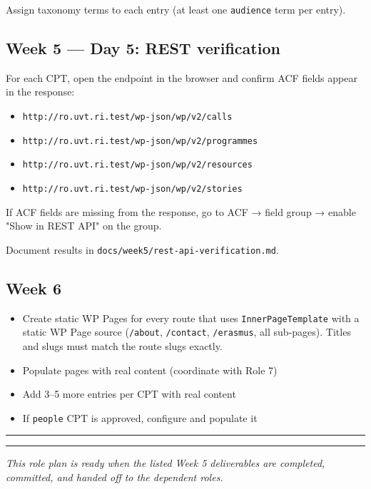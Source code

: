 \documentclass[11pt,a4paper]{article}
\newcommand{\grouprule}{\vspace{0.3em}\textcolor{ruleLine}{\rule{\linewidth}{0.4pt}}\vspace{0.3em}}
\begin{document}
Assign taxonomy terms to each entry (at least one \nolinkurl{audience} term per entry).

\subsection{Week 5 — Day 5: REST verification}

For each CPT, open the endpoint in the browser and confirm ACF fields appear in the response:
\begin{itemize}
\item \nolinkurl{http://ro.uvt.ri.test/wp-json/wp/v2/calls}
\item \nolinkurl{http://ro.uvt.ri.test/wp-json/wp/v2/programmes}
\item \nolinkurl{http://ro.uvt.ri.test/wp-json/wp/v2/resources}
\item \nolinkurl{http://ro.uvt.ri.test/wp-json/wp/v2/stories}
\end{itemize}

If ACF fields are missing from the response, go to ACF → field group → enable "Show in REST API" on the group.

Document results in \nolinkurl{docs/week5/rest-api-verification.md}.

\subsection{Week 6}

\begin{itemize}
\item Create static WP Pages for every route that uses \nolinkurl{InnerPageTemplate} with a static WP Page source (\nolinkurl{/about}, \nolinkurl{/contact}, \nolinkurl{/erasmus}, all sub-pages). Titles and slugs must match the route slugs exactly.
\item Populate pages with real content (coordinate with Role 7)
\item Add 3–5 more entries per CPT with real content
\item If \nolinkurl{people} CPT is approved, configure and populate it
\end{itemize}

\grouprule
\vspace{1.2em}
\textcolor{uvtYellow}{\rule{\linewidth}{1.5pt}}

{\small\textit{This role plan is ready when the listed Week 5 deliverables are completed, committed, and handed off to the dependent roles.}}
\end{document}
